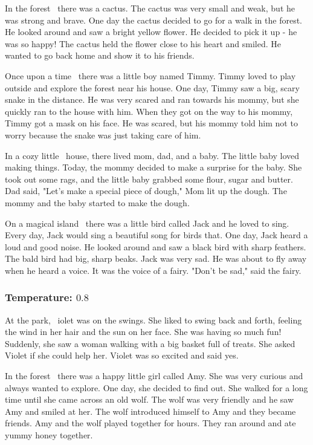 \documentclass[11pt]{article}
\begin{document}
    In the forest \textellipsis\ there was a cactus. The cactus was very small and weak, but he was strong and brave. One day the cactus decided to go for a walk in the forest. He looked around and saw a bright yellow flower. He decided to pick it up - he was so happy! The cactus held the flower close to his heart and smiled. He wanted to go back home and show it to his friends.

    Once upon a time \textellipsis\ there was a little boy named Timmy. Timmy loved to play outside and explore the forest near his house. One day, Timmy saw a big, scary snake in the distance. He was very scared and ran towards his mommy, but she quickly ran to the house with him. When they got on the way to his mommy, Timmy got a mask on his face. He was scared, but his mommy told him not to worry because the snake was just taking care of him.

    In a cozy little \textellipsis\ house, there lived mom, dad, and a baby. The little baby loved making things. Today, the mommy decided to make a surprise for the baby. She took out some rags, and the little baby grabbed some flour, sugar and butter. Dad said, "Let's make a special piece of dough," Mom lit up the dough. The mommy and the baby started to make the dough.

    On a magical island \textellipsis\ there was a little bird called Jack and he loved to sing. Every day, Jack would sing a beautiful song for birds that. One day, Jack heard a loud and good noise. He looked around and saw a black bird with sharp feathers. The bald bird had big, sharp beaks. Jack was very sad. He was about to fly away when he heard a voice. It was the voice of a fairy. "Don't be sad," said the fairy.

    \subsubsection*{Temperature: $0.8$}

    At the park, \textellipsis\ iolet was on the swings. She liked to swing back and forth, feeling the wind in her hair and the sun on her face. She was having so much fun! Suddenly, she saw a woman walking with a big basket full of treats. She asked Violet if she could help her. Violet was so excited and said yes.

    In the forest \textellipsis\ there was a happy little girl called Amy. She was very curious and always wanted to explore. One day, she decided to find out. She walked for a long time until she came across an old wolf. The wolf was very friendly and he saw Amy and smiled at her. The wolf introduced himself to Amy and they became friends. Amy and the wolf played together for hours. They ran around and ate yummy honey together.
\end{document}
